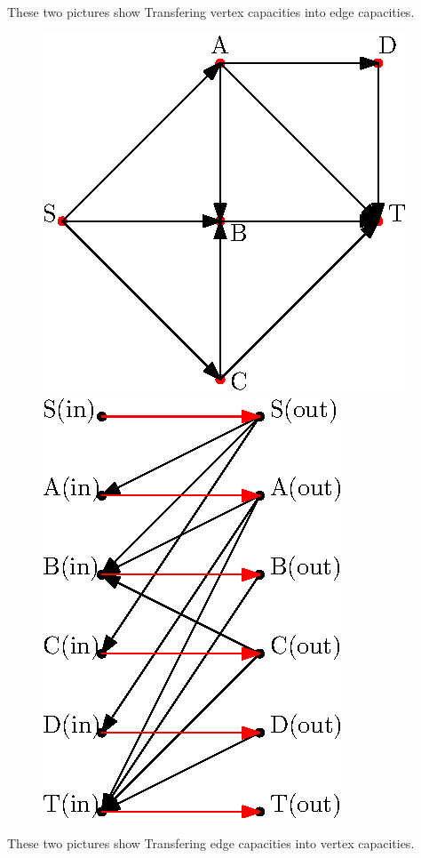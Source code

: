 \begin{enumerate}[(1)]
	These two pictures show Transfering vertex capacities into edge capacities.
	\begin{figure}[!htbp]
		\centering
		\includegraphics[totalheight=6cm]{source/xzj/pic1.eps}
		\includegraphics[totalheight=6cm]{source/xzj/pic2.eps}
	\end{figure}
	These two pictures show Transfering edge capacities into vertex capacities.
	\begin{figure}[!htbp]

\end{figure}
\end{enumerate}
